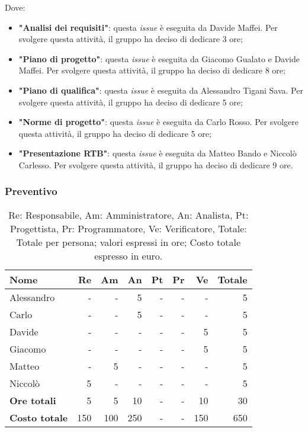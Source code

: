Dove:
\begin{itemize}
	\item \textbf{"Analisi dei requisiti"}: questa \textit{issue} è eseguita da
	      Davide Maffei. Per
	      svolgere questa attività, il gruppo ha deciso di dedicare 3 ore;

	\item \textbf{"Piano di progetto"}: questa \textit{issue} è eseguita da
	      Giacomo Gualato e Davide Maffei. Per svolgere questa attività, il gruppo ha deciso
	      di dedicare 8 ore;

	\item \textbf{"Piano di qualifica"}: questa \textit{issue} è eseguita da
	      Alessandro Tigani Sava. Per svolgere questa attività, il gruppo ha
	      deciso di dedicare 5 ore;

	\item \textbf{"Norme di progetto"}: questa \textit{issue} è eseguita da Carlo Rosso. 
			Per svolgere questa attività, il gruppo ha deciso di
	      dedicare 5 ore;

	\item \textbf{"Presentazione RTB"}: questa \textit{issue} è eseguita
	      da Matteo Bando e Niccolò Carlesso. Per svolgere questa
	      attività, il gruppo ha deciso di dedicare 9 ore.
\end{itemize}

\subsubsection{Preventivo}

\begin{table}[H]
	\centering
	\begin{tabular}{l|r|r|r|r|r|r|r}
	\textbf{Nome} & \textbf{Re} & \textbf{Am} & \textbf{An} & \textbf{Pt} & \textbf{Pr} & \textbf{Ve} & \textbf{Totale} \\
	\hline
		Alessandro & - & - & 5 & - & - & - & 5 \\
		Carlo & - & - & 5 & - & - & - & 5 \\
		Davide & - & - & - & - & - & 5 & 5 \\
		Giacomo & - & - & - & - & - & 5 & 5 \\
		Matteo & - & 5 & - & - & - & - & 5 \\
		Niccolò & 5 & - & - & - & - & - & 5 \\
	\hline
	\textbf{Ore totali} & 5 & 5 & 10 & - & - & 10 & 30 \\
	\textbf{Costo totale} & 150 & 100 & 250 & - & - & 150 & 650
	\end{tabular}
	\caption{Re: Responsabile, Am: Amministratore, An: Analista, Pt: Progettista,
		Pr: Programmatore, Ve: Verificatore, Totale: Totale per persona; valori espressi in ore; Costo totale espresso in euro.} 
\end{table}

